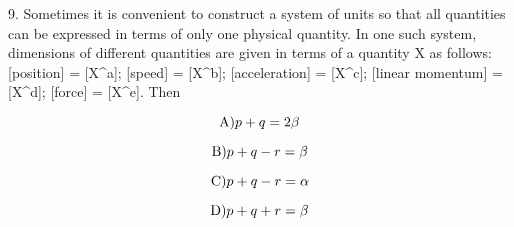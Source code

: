  9. Sometimes it is convenient to construct a system of units so that all quantities can be expressed in terms of only one physical quantity. In one such system, dimensions of different quantities are given in terms of a quantity X as follows: [position] = [X^a]; [speed] = [X^b]; [acceleration] = [X^c]; [linear momentum] = [X^d]; [force] = [X^e]. Then

$$\text{A)}\space p+q=2\beta$$

$$\text{B)}\space p+q-r=\beta$$

$$\text{C)}\space p+q-r=\alpha$$

$$\text{D)}\space p+q+r=\beta$$